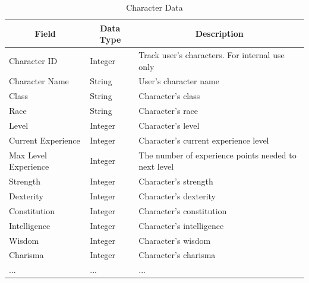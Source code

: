 \documentclass[12pt,letterpaper]{article}
\begin{document}
	\begin{table}[h]
		\centering
		\begin{tabular}{| l | l | p{7cm} |}
			\hline
			\multicolumn{1}{|c|}{\bf{Field}} & \multicolumn{1}{|c|}{\bf{Data Type}} & \multicolumn{1}{|c|}{\bf{Description}}\\ \hline
			Character ID & Integer & Track user's characters. For internal use only \\ \hline
			Character Name & String & User's character name \\ \hline
			Class & String & Character's class \\ \hline
			Race & String & Character's race \\ \hline
			Level & Integer & Character's level \\ \hline
			Current Experience & Integer & Character's current experience level \\ \hline
			Max Level Experience & Integer & The number of experience points needed to next level \\ \hline
			Strength & Integer & Character's strength \\ \hline
			Dexterity & Integer & Character's dexterity \\ \hline
			Constitution & Integer & Character's constitution \\ \hline
			Intelligence & Integer & Character's intelligence \\ \hline
			Wisdom & Integer & Character's wisdom \\ \hline
			Charisma & Integer & Character's charisma \\ \hline
			... & ... & ... \\ \hline
			\hline

		\end{tabular}
		\caption{Character Data}
		\label{tab:tableCharaterData}
	\end{table}			
\end{document}
